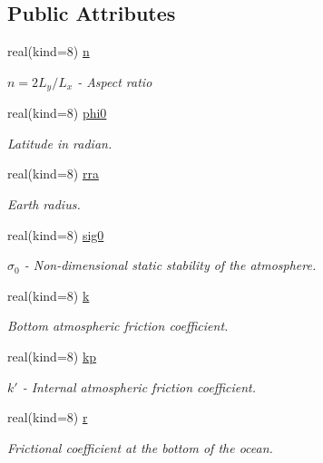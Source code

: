 \subsection*{Public Attributes}
\begin{DoxyCompactItemize}
\item 
real(kind=8) \hyperlink{classparams_abe66e904e07861ba1ef258ee92184e88}{n}
\begin{DoxyCompactList}\small\item\em $n = 2 L_y / L_x$ -\/ Aspect ratio \end{DoxyCompactList}\item 
real(kind=8) \hyperlink{classparams_a7e58166ca3fb2153f781aa623c5c31e6}{phi0}
\begin{DoxyCompactList}\small\item\em Latitude in radian. \end{DoxyCompactList}\item 
real(kind=8) \hyperlink{classparams_a192b2aa859cdeb4a0e285bcd0af346f4}{rra}
\begin{DoxyCompactList}\small\item\em Earth radius. \end{DoxyCompactList}\item 
real(kind=8) \hyperlink{classparams_a9115211e1d9169ad56a3fa924c5f7ef3}{sig0}
\begin{DoxyCompactList}\small\item\em $\sigma_0$ -\/ Non-\/dimensional static stability of the atmosphere. \end{DoxyCompactList}\item 
real(kind=8) \hyperlink{classparams_a6f40b299d2e21a177bf86afe5b06f790}{k}
\begin{DoxyCompactList}\small\item\em Bottom atmospheric friction coefficient. \end{DoxyCompactList}\item 
real(kind=8) \hyperlink{classparams_a7474ac35238cf6acd2b02e7e6261b41d}{kp}
\begin{DoxyCompactList}\small\item\em $k'$ -\/ Internal atmospheric friction coefficient. \end{DoxyCompactList}\item 
real(kind=8) \hyperlink{classparams_a714367f370ac26b8a281ebd6736407b7}{r}
\begin{DoxyCompactList}\small\item\em Frictional coefficient at the bottom of the ocean. \end{DoxyCompactList}\item 

\end{DoxyCompactItemize}
